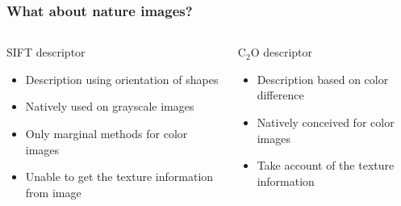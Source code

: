 \documentclass[xcolor=table]{beamer}
\begin{document}
\begin{frame} \frametitle{What about nature images?}


\begin{columns}[t]
  \begin{column}{5cm}
  \begin{block}{SIFT descriptor}
	\begin{itemize}
		\item Description using orientation of shapes
		\item Natively used on grayscale images
		\item Only marginal methods for color images
		\item Unable to get the texture information from image
	\end{itemize}
  \end{block}
  \end{column}

  \begin{column}{5cm}
  \begin{block}{C$_2$O descriptor}
  \begin{itemize}
		\item Description based on color difference
		\item Natively conceived for color images
		\item Take account of the texture information
  \end{itemize}
  \end{block}
  \end{column}
 \end{columns}
\end{frame}
\end{document}
